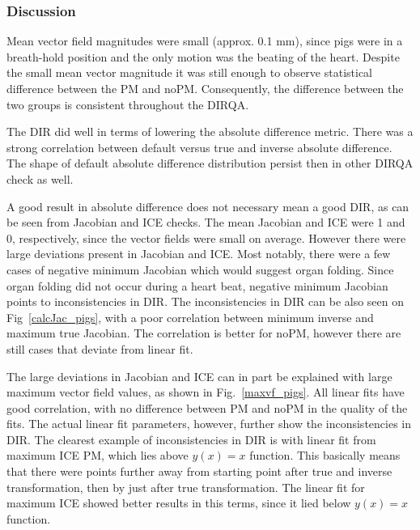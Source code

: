 \documentclass[type=dr, dr=rernat, accentcolor=tud7b,colorbacktitle, bigchapter, openright, twoside, 12pt ]{tudthesis}
\begin{document}
\subsubsection{Discussion}

Mean vector field magnitudes were small (approx. 0.1 mm), since pigs were in a breath-hold position and the only motion was the beating of the heart. 
Despite the small mean vector magnitude it was still enough to observe statistical difference between the PM and noPM.
Consequently, the difference between the two groups is consistent throughout the DIRQA.

The DIR did well in terms of lowering the absolute difference metric. There was a strong correlation between default versus true and inverse absolute difference. The shape of default absolute difference
distribution persist then in other DIRQA check as well.

A good result in absolute difference does not necessary mean a good DIR, as can be seen from Jacobian and ICE checks. The mean Jacobian and ICE were 1 and 0, respectively, since the
vector fields were small on average. However there were large deviations present in Jacobian and ICE. Most notably, there were a few cases of negative minimum Jacobian which would suggest 
organ folding. Since organ folding did not occur during a heart beat, negative minimum Jacobian points to inconsistencies in DIR. The inconsistencies in DIR can be also seen on Fig~\ref{calcJac_pigs},
with a poor correlation between minimum inverse and maximum true Jacobian. The correlation is better for noPM, however there are still cases that deviate from linear fit.

The large deviations in Jacobian and ICE can in part be explained with large maximum vector field values, as shown in Fig.~\ref{maxvf_pigs}. All linear fits have good correlation, with no
difference between PM and noPM in the quality of the fits. The actual linear fit parameters, however, further show the inconsistencies in DIR. The clearest example of inconsistencies in
DIR is with linear fit from maximum ICE PM, which lies above $y(x)=x$ function. This basically means that there were points further away from starting point after true and inverse transformation, 
then by just after true transformation. The linear fit for maximum ICE showed better results in this terms, since it lied below $y(x)=x$ function.


\end{document}
